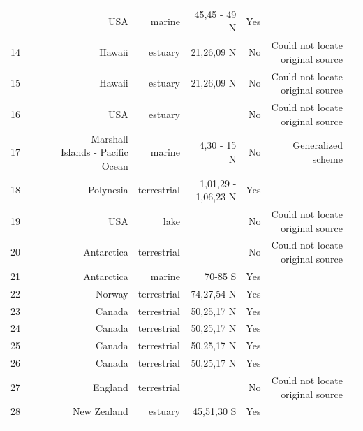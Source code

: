 \documentclass[12pt]{article}
\begin{document}
\begin{landscape}
\begin{table}[h!]
\begin{tabular}{rrrrrrrrr}
{      13    & ~\citet{GlobalWeb} & ~\citet{Menge1976} & USA   & marine & 45,45 - 49 N & Yes   &       &  \\
      14    & ~\citet{GlobalWeb} & ~\citet{Walsh1967} & Hawaii & estuary & 21,26,09 N & No    & Could not locate original source &  \\
      15    & ~\citet{GlobalWeb} & ~\citet{Walsh1967} & Hawaii & estuary & 21,26,09 N & No    & Could not locate original source &  \\
      16    & ~\citet{GlobalWeb} & ~\citet{Copeland1974} & USA   & estuary &       & No    & Could not locate original source &  \\
      17    & ~\citet{GlobalWeb} & ~\citet{Hiatt1960} & Marshall Islands - Pacific Ocean & marine & 4,30 - 15 N & No    & Generalized scheme &  \\
      18    & ~\citet{GlobalWeb} & ~\citet{Niering1963a} & Polynesia & terrestrial & 1,01,29 - 1,06,23 N & Yes   &       &  \\
      19    & ~\citet{GlobalWeb} & ~\citet{Brooks1963} & USA   & lake &       & No    & Could not locate original source &  \\
      20    & ~\citet{GlobalWeb} & ~\citet{Knox1970} & Antarctica & terrestrial &       & No    & Could not locate original source &  \\
      21    & ~\citet{GlobalWeb} & ~\citet{Patten1979} & Antarctica & marine & 70-85 S & Yes   &       &  \\
      22    & ~\citet{GlobalWeb} & ~\citet{Summerhayes1923} & Norway & terrestrial & 74,27,54 N & Yes   &       &  \\
      23    & ~\citet{GlobalWeb} & ~\citet{Bird1930} & Canada & terrestrial & 50,25,17 N & Yes   &       &  \\
      24    & ~\citet{GlobalWeb} & ~\citet{Bird1930} & Canada & terrestrial & 50,25,17 N & Yes   &       &  \\
      25    & ~\citet{GlobalWeb} & ~\citet{Bird1930} & Canada & terrestrial & 50,25,17 N & Yes   &       &  \\
      26    & ~\citet{GlobalWeb} & ~\citet{Bird1930} & Canada & terrestrial & 50,25,17 N & Yes   &       &  \\
      27    & ~\citet{GlobalWeb} & ~\citet{Varley1970} & England & terrestrial &       & No    & Could not locate original source &  \\
      28    & ~\citet{GlobalWeb} & ~\citet{Paviour-Smith1956} & New Zealand & estuary & 45,51,30 S & Yes   &       &  \\
}
\end{tabular}
\end{table}
\end{landscape}
\end{document}
